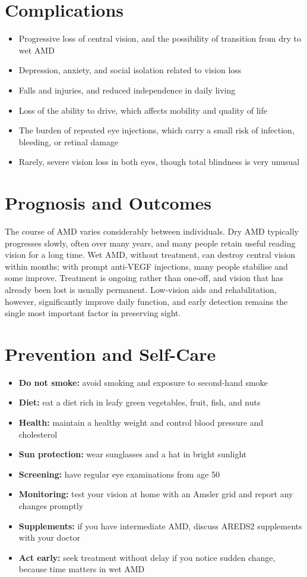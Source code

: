 \section*{Complications}
\begin{itemize}
    \item Progressive loss of central vision, and the possibility of transition from dry to wet AMD
    \item Depression, anxiety, and social isolation related to vision loss
    \item Falls and injuries, and reduced independence in daily living
    \item Loss of the ability to drive, which affects mobility and quality of life
    \item The burden of repeated eye injections, which carry a small risk of infection, bleeding, or retinal damage
    \item Rarely, severe vision loss in both eyes, though total blindness is very unusual
\end{itemize}

\section*{Prognosis and Outcomes}
The course of AMD varies considerably between individuals. Dry AMD typically progresses slowly, often over many years, and many people retain useful reading vision for a long time. Wet AMD, without treatment, can destroy central vision within months; with prompt anti-VEGF injections, many people stabilise and some improve. Treatment is ongoing rather than one-off, and vision that has already been lost is usually permanent. Low-vision aids and rehabilitation, however, significantly improve daily function, and early detection remains the single most important factor in preserving sight.

\section*{Prevention and Self-Care}
\begin{itemize}
    \item \textbf{Do not smoke:} avoid smoking and exposure to second-hand smoke
    \item \textbf{Diet:} eat a diet rich in leafy green vegetables, fruit, fish, and nuts
    \item \textbf{Health:} maintain a healthy weight and control blood pressure and cholesterol
    \item \textbf{Sun protection:} wear sunglasses and a hat in bright sunlight
    \item \textbf{Screening:} have regular eye examinations from age 50
    \item \textbf{Monitoring:} test your vision at home with an Amsler grid and report any changes promptly
    \item \textbf{Supplements:} if you have intermediate AMD, discuss AREDS2 supplements with your doctor
    \item \textbf{Act early:} seek treatment without delay if you notice sudden change, because time matters in wet AMD
\end{itemize}

